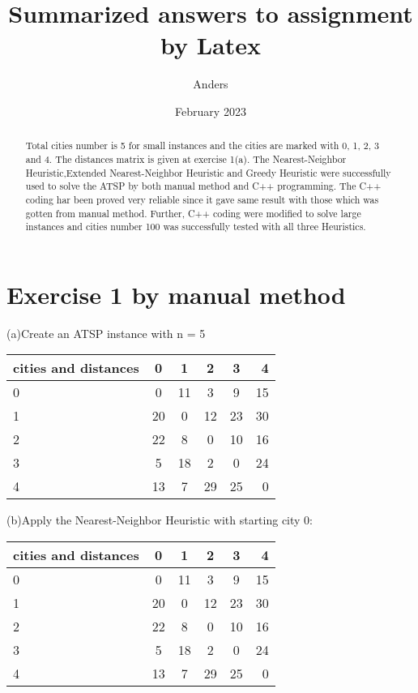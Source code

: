 \documentclass[12pt, letterpaper]{article}
\title{Summarized answers to assignment by Latex}
\author{Anders}
\date{February 2023}
\begin{document}
\setlength{\parindent}{0pt}
		
\maketitle
\begin{abstract}
  Total	cities number is 5 for small instances and the cities are marked with 0, 1, 2, 3 and 4. The distances matrix is given at exercise 1(a). The Nearest-Neighbor Heuristic,Extended Nearest-Neighbor Heuristic and Greedy Heuristic were successfully used to solve the ATSP by both manual method and  C++ programming. The C++ coding har been proved very reliable since it gave same result with those which was gotten from manual method. Further, C++ coding were modified to solve large instances and cities number 100 was successfully tested with all three Heuristics.
\end{abstract}
\section{Exercise 1 by manual method}
(a)Create an ATSP instance with n = 5\\

{
	\centering
	
	\begin{tabular}{|l|| c| c| c| c| r|}
    \hline
 	cities and distances & 0 & 1 & 2 & 3 & 4 \\
 	\hline \hline
 	0 & 0 & 11 & 3 & 9 & 15\\
 	\hline
 	1 & 20 & 0 & 12 & 23 &30\\
 	\hline
 	2 &22& 8 &0 &10& 16\\
 	\hline
 	3 &5 &18 &2 &0 &24\\
 	\hline
 	4 &13 &7 &29& 25& 0\\
 	\hline
 	
 	\end{tabular}\par
 
}
\hspace*{\fill}

(b)Apply the Nearest-Neighbor Heuristic with starting city 0:

\begin{center} 
		
	\begin{tabular}{|l|| c| c| c| c| r|}
		\hline
		cities and distances & 0 & 1 & 2 & 3 & 4 \\
		\hline \hline
		0 & 0 & 11 & {\color{blue}3}  & 9 & 15\\
		\hline
		1 & 20 & 0 & 12 & 23 &30\\
		\hline
		2 &22& 8 &0 &10& 16\\
		\hline
		3 &5 &18 &2 &0 &24\\
		\hline
		4 &13 &7 &29& 25& 0\\
		\hline
	\end{tabular}
\end{center}
\end{document}
